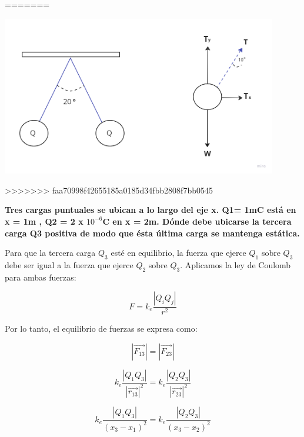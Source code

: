\documentclass[answers]{exam} %
\begin{document}
\begin{questions}
\begin{multicols}{2}
\begin{minipage}{\textwidth}
\begin{tikzpicture}[scale=1]
			\end{tikzpicture}
		\end{minipage}
	\end{multicols}
=======
	\begin{minipage}{\textwidth}
		\centering
		\includegraphics[width=0.9\textwidth]{public/g3.png}\\
	\end{minipage}
>>>>>>> faa70998f42655185a0185d34fbb2808f7bb0545

	\vspace{0.5cm}
	\newpage

	\newpage

	\question \large\textbf{Tres cargas puntuales se ubican a lo largo del eje x. Q1= 1mC está en x = 1m ,  Q2 = 2 x $10^{-6}$C en x = 2m. Dónde debe ubicarse la tercera carga Q3 positiva de modo que
		ésta última carga se mantenga estática.}

	\begin{multicols}{2} %

		Para que la tercera carga \( Q_3 \) esté en equilibrio, la fuerza que ejerce \( Q_1 \) sobre \( Q_3 \) debe ser igual a la fuerza que ejerce \( Q_2 \) sobre \( Q_3 \). Aplicamos la ley de Coulomb para ambas fuerzas:

		\[
			F = k_e \frac{|Q_i Q_j|}{r^2}
		\]

		Por lo tanto, el equilibrio de fuerzas se expresa como:

		\[
			|\vec{F_{13}}| = |\vec{F_{23}}|
		\]

		\[
			k_e \dfrac{|Q_1 Q_3|}{|\vec{r_{13}}|^2} = k_e \dfrac{|Q_2 Q_3|}{|\vec{r_{23}}|^2}
		\]

		\[
			k_e \dfrac{|Q_1 Q_3|}{(x_3 - x_1)^2} = k_e \dfrac{|Q_2 Q_3|}{(x_3 - x_2)^2}
		\]


\end{multicols}
\end{questions}
\end{document}
